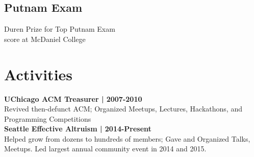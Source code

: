 \documentclass[]{resume}
\begin{document}
\begin{minipage}[t]{0.33\textwidth}
\subsection{Putnam Exam}
Duren Prize for Top Putnam Exam \\
score at McDaniel College

\sectionsep

\section{Activities} 
\textbf{UChicago ACM Treasurer | 2007-2010} \\
Revived then-defunct ACM; Organized Meetups, Lectures, 
Hackathons, and Programming Competitions \\
\sectionsep
\textbf{Seattle Effective Altruism | 2014-Present}\\
Helped grow  from dozens to hundreds of members; 
Gave and Organized Talks, Meetups. Led largest annual 
community event in 2014 and 2015. \\


%
%

\end{minipage} 
\hfill
\end{document}
